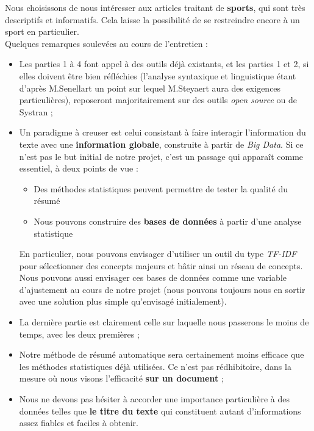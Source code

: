 \documentclass{article}           %
\begin{document}
Nous choisissons de nous intéresser aux articles traitant de \textbf{sports}, qui sont très descriptifs et informatifs. Cela laisse la possibilité de se restreindre encore à un sport en particulier.\\

Quelques remarques soulevées au cours de l'entretien :
\begin{itemize}
 \item Les parties 1 à 4 font appel à des outils déjà existants, et les parties 1 et 2, si elles doivent être bien réfléchies (l'analyse syntaxique et linguistique étant d'après M.Senellart un point sur lequel M.Steyaert aura des exigences particulières), reposeront majoritairement sur des outils \emph{open source} ou de Systran ;
 \item Un paradigme à creuser est celui consistant à faire interagir l'information du texte avec une \textbf{information globale}, construite à partir de \emph{Big Data}. Si ce n'est pas le but initial de notre projet, c'est un passage qui apparaît comme essentiel, à deux points de vue :
 \begin{itemize}
  \item Des méthodes statistiques peuvent permettre de tester la qualité du résumé
  \item Nous pouvons construire des \textbf{bases de données} à partir d'une analyse statistique
 \end{itemize}
 En particulier, nous pouvons envisager d'utiliser un outil du type \emph{TF-IDF} pour sélectionner des concepts majeurs et bâtir ainsi un réseau de concepts. Nous pouvons aussi envisager ces bases de données comme une variable d'ajustement au cours de notre projet (nous pouvons toujours nous en sortir avec une solution plus simple qu'envisagé initialement).\\

 \item La dernière partie est clairement celle sur laquelle nous passerons le moins de temps, avec les deux premières ;
 \item Notre méthode de résumé automatique sera certainement moins efficace que les méthodes statistiques déjà utilisées. Ce n'est pas rédhibitoire, dans la mesure où nous visons l'efficacité \textbf{sur un document} ;
 \item Nous ne devons pas hésiter à accorder une importance particulière à des données telles que \textbf{le titre du texte} qui constituent autant d'informations assez fiables et faciles à obtenir.
\end{itemize}
\end{document}

